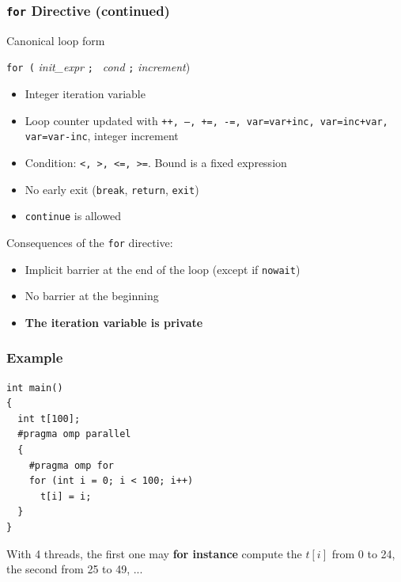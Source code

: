 \documentclass{beamer}
\begin{document}
\begin{frame}
  \frametitle{\texttt{for} Directive (continued)}

  \begin{block}{Canonical loop form}
  
 \centerline{ {\tt for (} {\it init\_expr} {\tt ; } {\it cond} {\tt ;} {\it increment})}
 
\begin{itemize}
\item Integer iteration variable

\item Loop counter updated with \texttt{++, --, +=, -=, var=var+inc,
    var=inc+var, var=var-inc}, integer increment

\item Condition: \texttt{<, >, <=, >=}. Bound is a fixed expression

\item No early exit ({\tt break}, {\tt return}, {\tt exit})
\item \texttt{continue} is allowed
\end{itemize}
\end{block}

\medskip

Consequences of the \texttt{for} directive:
\begin{itemize}
\item Implicit barrier at the end of the loop (except if {\tt nowait})
\item No barrier at the beginning
\item \textbf{The iteration variable is private}
\end{itemize}

\end{frame}


\begin{frame}[fragile=singleslide]
  \frametitle{Example}
\begin{verbatim}
int main()
{
  int t[100];
  #pragma omp parallel 
  {
    #pragma omp for  
    for (int i = 0; i < 100; i++)
      t[i] = i;
  }
}
\end{verbatim}

  With 4 threads, the first one may {\bf for instance} compute the $t[i]$ from 0 to 24,
  the second from 25 to 49, ...
\end{frame}
\end{document}
